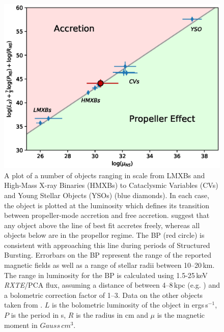 \begin{figure}
 \centering
 \includegraphics[width=.82\linewidth, trim={0.6cm 0.1cm 1.0cm 1.1cm},clip]{images/propeff.eps}
 \caption{\small A plot of a number of objects ranging in scale from LMXBs and High-Mass X-ray Binaries (HMXBs) to Cataclysmic Variables (CVs) and Young Stellar Objects (YSOs) (blue diamonds). In each case, the object is plotted at the luminosity which defines its transition between propeller-mode accretion and free accretion. \citealp{Campana_PropBorder} suggest that any object above the line of best fit accretes freely, whereas all objects below are in the propellor regime. The BP (red circle) is consistent with approaching this line during periods of Structured Bursting. Errorbars on the BP represent the range of the reported magnetic fields as well as a range of stellar radii between 10--20\,km. The range in luminosity for the BP is calculated using 1.5-25\,keV \textit{RXTE}/PCA flux, assuming a distance of between 4--8\,kpc (e.g. \citealp{Kouveliotou_BP,Gosling_BPCompanion,Sanna_BP}) and a bolometric correction factor of 1--3.  Data on the other objects taken from \citealp{Campana_PropBorder}. $L$ is the bolometric luminosity of the object in ergs\,s$^{-1}$, $P$ is the period in s, $R$ is the radius in cm and $\mu$ is the magnetic moment in $Gauss\,cm^3$.}
 \label{fig:propBorder}
\end{figure}

